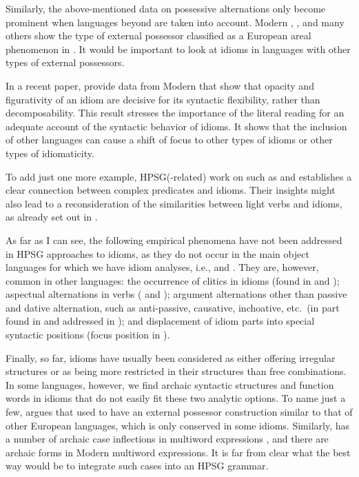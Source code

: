 \documentclass[output=paper,biblatex,babelshorthands,newtxmath,draftmode,colorlinks,citecolor=brown]{langscibook}
\begin{document}
Similarly, the above-mentioned data on possessive alternations only become prominent when languages beyond  are taken into account. Modern , , and many others
show the type of external possessor classified as a European areal phenomenon in \citet{Haspelmath:99}. 
It would be important to look at idioms in languages with other types of external possessors.


In a recent paper, \citet{Sheinfux:al:19} provide data from Modern  that show that opacity and figurativity of an idiom are decisive for its syntactic flexibility, rather than decomposability.
This result stresses the importance of the literal reading for an adequate account of the syntactic behavior of idioms. 
%
It shows that the inclusion of other languages can cause a shift of focus to other types of idioms or other types of idiomaticity. 

To add just one more example, HPSG(-related) work on  such as \citet{MuellerPersian}
and \citet{Samvelian:Faghiri:16} establishes a clear connection between complex predicates and
idioms. Their insights might also lead to a reconsideration of the similarities between light verbs
and idioms, as already set out in \citet{KE94a}. 


As far as I can see, the following empirical phenomena have not been addressed in HPSG approaches to
idioms, as they do not occur in the main object languages for which we have idiom analyses, i.e.,
 and . They are, however, common in other languages: the occurrence of
clitics in idioms (found in  and );
aspectual alternations in verbs ( and ); argument
alternations other than passive and dative alternation, such as anti-passive,
causative, inchoative, etc.\ (in part found in  and
addressed in \citealt{Sheinfux:al:19}); and displacement of idiom parts into special syntactic
positions (focus position in ).

Finally, so far, idioms have usually been considered as either offering irregular structures or as
being more restricted in their structures than free combinations. In some languages, however, we
find archaic syntactic structures and function words in idioms that do not easily fit these two
analytic options. To name just a few, \citet{Lodrup:09} argues that 
used to have an external possessor construction similar to that of other European languages, which
is only conserved in some idioms. Similarly,  has a number of archaic case
inflections in multiword expressions \citep[]{Kuiper:18}, and there are archaic forms in
Modern  multiword expressions. It is far from clear what the best way would be
to integrate such cases into an HPSG grammar.
\end{document}
